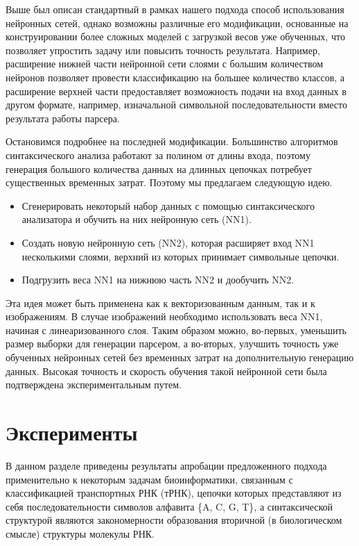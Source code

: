 Выше был описан стандартный в рамках нашего подхода способ использования нейронных сетей, однако возможны различные его модификации, основанные на конструировании более сложных моделей с загрузкой весов уже обученных, что позволяет упростить задачу или повысить точность результата. Например, расширение нижней части нейронной сети слоями с большим количеством нейронов позволяет провести классификацию на большее количество классов, а расширение верхней части предоставляет возможность подачи на вход данных в другом формате, например, изначальной символьной последовательности вместо результата работы парсера.

Остановимся подробнее на последней модификации. Большинство алгоритмов синтаксического анализа работают за полином от длины входа, поэтому генерация большого количества данных на длинных цепочках потребует существенных временных затрат. Поэтому мы предлагаем следующую идею.
\begin{itemize}
    \item Сгенерировать некоторый набор данных с помощью синтаксического анализатора и обучить на них нейронную сеть (NN1).
    \item Создать новую нейронную сеть (NN2), которая расширяет вход NN1 несколькими слоями, верхний из которых принимает символьные цепочки.
    \item Подгрузить веса NN1 на нижнюю часть NN2 и дообучить NN2.
\end{itemize}

Эта идея может быть применена как к векторизованным данным, так и к изображениям. В случае изображений необходимо использовать веса NN1, начиная с линеаризованного слоя. Таким образом можно, во-первых, уменьшить размер выборки для генерации парсером, а во-вторых, улучшить точность уже обученных нейронных сетей без временных затрат на дополнительную генерацию данных. Высокая точность и скорость обучения такой нейронной сети была подтверждена экспериментальным путем.

\section{Эксперименты}
В данном разделе приведены результаты апробации предложенного подхода применительно к некоторым задачам биоинформатики, связанным с классификацией транспортных РНК (тРНК), цепочки которых представляют из себя последовательности символов алфавита \{A, C, G, T\}, а синтаксической структурой являются закономерности образования вторичной (в биологическом смысле) структуры молекулы РНК.

